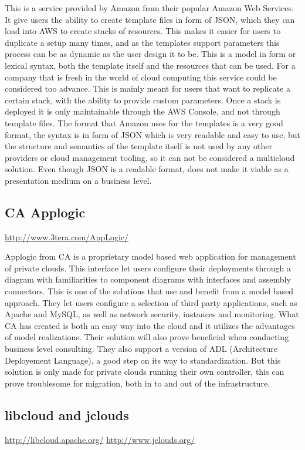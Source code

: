 This is a service provided by Amazon from their popular Amazon Web Services. 
It give users the ability to create template files in form of JSON, which they can load into AWS to create stacks of resources. 
This makes it easier for users to duplicate a setup many times, and as the templates support parameters this process 
can be as dynamic as the user design it to be. This is a model in form or lexical syntax, both the template itself and the resources that can be used.
For a company that is fresh in the world of cloud computing this service could be considered too advance. 
This is mainly meant for users that want to replicate a certain stack, with the ability to provide custom parameters. 
Once a stack is deployed it is only maintainable through the AWS Console, and not through template files. 
The format that Amazon uses for the templates is a very good format, the syntax is in form of JSON which is very readable and easy to use, 
but the structure and semantics of the template itself is not used by any other providers or cloud management tooling, 
so it can not be considered a multicloud solution. Even though JSON is a readable format, does not make it viable as a presentation medium on a business level.

\subsection{CA Applogic}
\url{http://www.3tera.com/AppLogic/}

Applogic from CA is a proprietary model based web application for management of private clouds. 
This interface let users configure their deployments through a diagram with familiarities to component diagrams with interfaces and assembly connectors. 
This is one of the solutions that use and benefit from a model based approach. They let users configure a selection of third party applications, 
such as Apache and MySQL, as well as network security, instances and monitoring. 
What CA has created is both an easy way into the cloud and it utilizes the advantages of model realizations. 
Their solution will also prove beneficial when conducting business level consulting. 
They also support a version of ADL (Architecture Deployement Language), a good step on its way to standardization. 
But this solution is only made for private clouds running their own controller, this can prove troublesome for migration, both in to and out of the infrastructure.

\subsection{libcloud and jclouds}
\url{http://libcloud.apache.org/}
\url{http://www.jclouds.org/}

